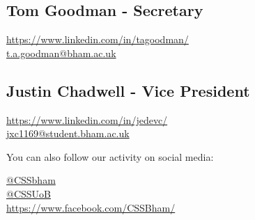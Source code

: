 \documentclass{article}
\begin{document}
\subsection*{Tom Goodman - Secretary}

\faLinkedin \hspace{0.1cm} \url{https://www.linkedin.com/in/tagoodman/} \\
\faEnvelope \hspace{0.1cm} \href{mailto:t.a.goodman@bham.ac.uk}{t.a.goodman@bham.ac.uk}

\subsection*{Justin Chadwell - Vice President}

\faLinkedin \hspace{0.1cm} \url{https://www.linkedin.com/in/jedevc/} \\
\faEnvelope \hspace{0.1cm} \href{mailto:jxc1169@student.bham.ac.uk}{jxc1169@student.bham.ac.uk}

\vspace{1cm}

\noindent You can also follow our activity on social media:

\noindent \faTwitter  \hspace{0.1cm} \href{https://twitter.com/cssbham}{@CSSbham} \\
\faInstagram  \hspace{0.1cm} \href{https://facebook.com/groups/CSSUoB/}{@CSSUoB} \\
\faFacebook  \hspace{0.3cm} \url{https://www.facebook.com/CSSBham/}
\end{document}
